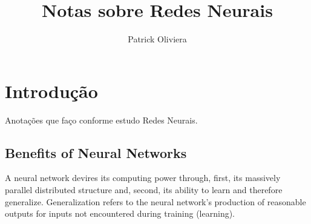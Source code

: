 \documentclass[twocolumn]{article}
\title{Notas sobre Redes Neurais}
\author{Patrick Oliviera}
\affil{.}
\begin{document}
\maketitle

\section{Introdução}
 Anotações que faço conforme estudo Redes Neurais.

 \subsection{Benefits of Neural Networks}
	 A neural network devires its computing power through, first, its massively parallel distributed structure and, second, its ability to learn and therefore generalize. Generalization refers to the neural network's production of reasonable outputs for inputs not encountered during training (learning).
\end{document}
